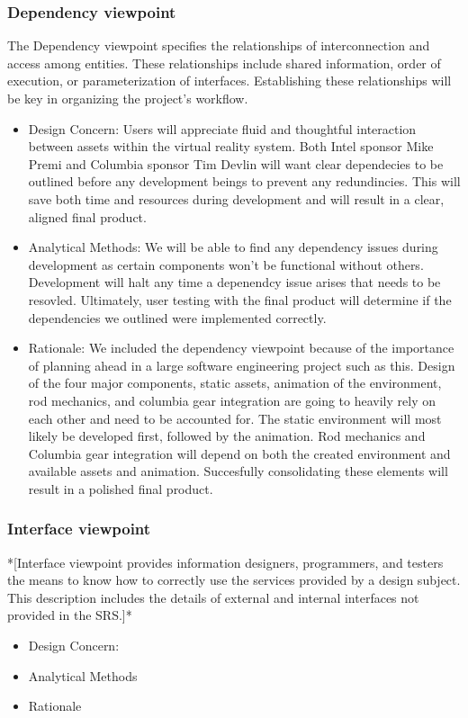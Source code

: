 \documentclass[10pt,journal,compsoc,onecolumn, draftclsnofoot]{IEEEtran}
\begin{document}
\subsubsection{Dependency viewpoint}
The Dependency viewpoint specifies the relationships of interconnection and access among entities. These relationships include shared information, order of execution, or parameterization of interfaces. Establishing these relationships will be key in organizing the project's workflow.
\begin{itemize}
  \item Design Concern: Users will appreciate fluid and thoughtful interaction between assets within the virtual reality system. Both Intel sponsor Mike Premi and Columbia sponsor Tim Devlin will want clear dependecies to be outlined before any development beings to prevent any redundincies. This will save both time and resources during development and will result in a clear, aligned final product.
  \item Analytical Methods: We will be able to find any dependency issues during development as certain components won't be functional without others. Development will halt any time a depenendcy issue arises that needs to be resovled. Ultimately, user testing with the final product will determine if the dependencies we outlined were implemented correctly.
  \item Rationale: We included the dependency viewpoint because of the importance of planning ahead in a large software engineering project such as this. Design of the four major components, static assets, animation of the environment, rod mechanics, and columbia gear integration are going to heavily rely on each other and need to be accounted for. The static environment will most likely be developed first, followed by the animation. Rod mechanics and Columbia gear integration will depend on both the created environment and available assets and animation. Succesfully consolidating these elements will result in a polished final product.
\end{itemize}
\subsubsection{Interface viewpoint}
*[Interface viewpoint provides information designers, programmers, and testers the means to know how to correctly use the services provided by a design subject. This description includes the details of external and internal interfaces not provided in the SRS.]*
\begin{itemize}
  \item Design Concern:
  \item Analytical Methods
  \item Rationale
\end{itemize}
\end{document}
